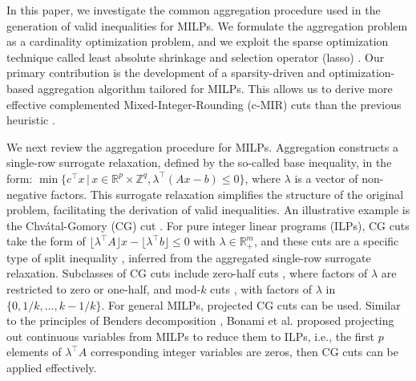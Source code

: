 \documentclass[a4paper,UKenglish,cleveref, autoref,  thm-restate]{lipics-v2021}
\def\ie{{i.e.,} }
\newcommand{\bR}{\mathbb{R}}
\newcommand{\bZ}{\mathbb{Z}}
\newcommand{\floor}[1]{\lfloor #1 \rfloor}
\begin{document}
	
	In this paper, we investigate the common aggregation procedure \cite{marchand2001aggregation} used in the generation of valid inequalities for MILPs.
	We formulate the aggregation problem as a cardinality optimization problem, and we exploit the sparse optimization technique called least absolute shrinkage and selection operator (lasso) \cite{tibshirani1996regression}.
	Our primary contribution is the development of a sparsity-driven and optimization-based aggregation algorithm tailored for MILPs. This allows us to derive more effective complemented Mixed-Integer-Rounding (c-MIR) cuts \cite{marchand19990,nemhauser1990recursive} than the previous heuristic \cite{marchand2001aggregation}.
	
	
	We next review the aggregation procedure for MILPs.
	Aggregation constructs a single-row surrogate relaxation, defined by the so-called base inequality, in the form: $ \min \{c^\top x \,|\, x \in \bR^p \times \bZ^{q}, \lambda^\top(Ax - b) \le 0\}$, where $\lambda$ is a vector of non-negative factors. This surrogate relaxation simplifies the structure of the original problem, facilitating the derivation of valid inequalities. An illustrative example is the Chvátal-Gomory (CG) cut \cite{chvatal1973edmonds,fischetti2007optimizing}. For pure integer linear programs (ILPs), CG cuts take the form of $\floor{\lambda^\top A} x - \floor{\lambda^\top b} \le 0$ with $\lambda \in \bR^m_+$, and these cuts are a specific type of split inequality  \cite{cook1990chvatal}, inferred from the aggregated single-row surrogate relaxation. Subclasses of CG cuts include zero-half cuts \cite{caprara19960}, where factors of $\lambda$ are restricted to  zero or one-half, and mod-$k$ cuts \cite{caprara2000separation}, with factors of $\lambda$ in $\{0, 1/k, \dots, k-1/k\}$. For general MILPs, projected CG cuts can be used.  Similar to the principles of  Benders decomposition \cite{bnnobrs1962partitioning}, Bonami et al. \cite{bonami2008projected} proposed projecting out continuous variables from MILPs to reduce them to ILPs, \ie the first $p$ elements of $\lambda^\top A$ corresponding integer variables are zeros, then CG cuts can be applied effectively.
	
\end{document}
